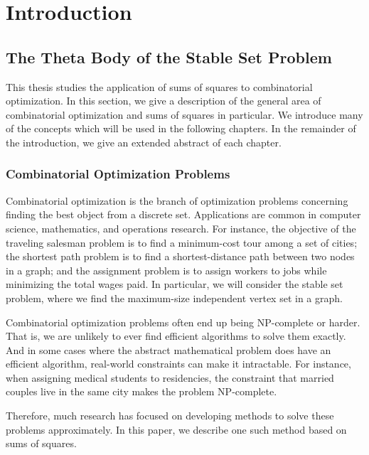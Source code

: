


\chapter{Introduction}
\label{chap:Introduction}

\section{The Theta Body of the Stable Set Problem}
This thesis studies the application of sums of squares to combinatorial optimization. 
In this section, we give a description of the general area of combinatorial optimization and sums of squares in particular.
We introduce many of the concepts which will be used in the following chapters. 
In the remainder of the introduction, we give an extended abstract of each chapter.

\subsection{Combinatorial Optimization Problems}
Combinatorial optimization is the branch of optimization problems concerning finding the best object from a discrete set. 
Applications are common in computer science, mathematics, and operations research.
For instance, the objective of the traveling salesman problem is to find a minimum-cost tour among a set of cities; the shortest path problem is to find a shortest-distance path between two nodes in a graph; and the assignment problem is to assign workers to jobs while minimizing the total wages paid. 
In particular, we will consider the stable set problem, where we find the maximum-size independent vertex set in a graph.

Combinatorial optimization problems often end up being NP-complete or harder. 
That is, we are unlikely to ever find efficient algorithms to solve them exactly. 
And in some cases where the abstract mathematical problem does have an efficient algorithm, real-world constraints can make it intractable. 
For instance, when assigning medical students to residencies, the constraint that married couples live in the same city makes the problem NP-complete.

Therefore, much research has focused on developing methods to solve these problems approximately. 
In this paper, we describe one such method based on sums of squares.

